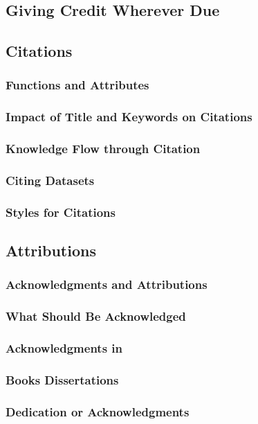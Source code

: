 \documentclass{article}
\begin{document}
	\subsection{Giving Credit Wherever Due}
	\subsection{Citations}
	\subsubsection{Functions and Attributes}
	\subsubsection{Impact of Title and Keywords on Citations}
	\subsubsection{Knowledge Flow through Citation}
	\subsubsection{Citing Datasets}
	\subsubsection{Styles for Citations}

	\subsection{Attributions}
	\subsubsection{Acknowledgments and Attributions}
	\subsubsection{What Should Be Acknowledged}
	\subsubsection{Acknowledgments in}
	\subsubsection{Books Dissertations}
	\subsubsection{Dedication or Acknowledgments}
\end{document}
